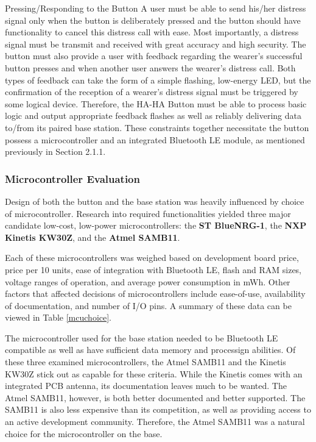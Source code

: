 \documentclass[journal,compsoc]{IEEEtran}
\begin{document}
\begin{LaTeXdescription}
\item[Pressing/Responding to the Button] A user must be able to send his/her distress signal only when the button is deliberately pressed and the button should have functionality to cancel this distress call with ease. Most importantly, a distress signal must be transmit and received with great accuracy and high security. The button must also provide a user with feedback regarding the wearer's successful button presses and when another user answers the wearer's distress call.  Both types of feedback can take the form of a simple flashing, low-energy LED, but the confirmation of the reception of a wearer's distress signal must be triggered by some logical device. Therefore, the HA-HA Button must be able to process basic logic and output appropriate feedback flashes as well as reliably delivering data to/from its paired base station.  These constraints together necessitate the button possess a microcontroller and an integrated Bluetooth LE module, as mentioned previously in Section 2.1.1.
\end{LaTeXdescription}

\subsubsection{Microcontroller Evaluation}

Design of both the button and the base station was heavily influenced by choice of microcontroller.  Research into required functionalities yielded three major candidate low-cost, low-power microcontrollers:
the \textbf{ST BlueNRG-1}, 
the \textbf{NXP Kinetis KW30Z}, and 
the \textbf{Atmel SAMB11}.

Each of these microcontrollers was weighed based on development board price, price per 10 units, ease of integration with Bluetooth LE, flash and RAM sizes, voltage ranges of operation, and average power consumption in mWh.  Other factors that affected decisions of microcontrollers include ease-of-use, availability of documentation, and number of I/O pins. A summary of these data can be viewed in Table \ref{mcuchoice}. 

The microcontroller used for the base station needed to be Bluetooth LE compatible as well as have sufficient data memory and processign abilities.  Of these three examined microcontrollers, the Atmel SAMB11 and the Kinetis KW30Z stick out as capable for these criteria. While the Kinetis comes with an integrated PCB antenna, its documentation leaves much to be wanted. The Atmel SAMB11, however, is both better documented and better supported. The SAMB11 is also less expensive than its competition, as well as providing access to an active development community.  Therefore, the Atmel SAMB11 was a natural choice for the microcontroller on the base.
\end{document}
